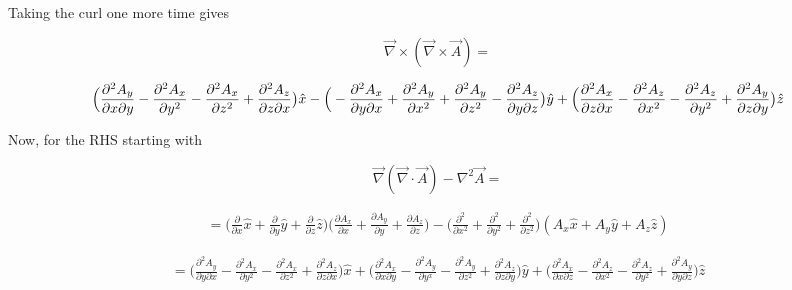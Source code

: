 \documentclass[11pt]{article}
\begin{document}
Taking the curl one more time gives

$$
\vec{\nabla} \times (\vec{\nabla} \times \vec{A}) = 
$$

$$
\Big(\frac{\partial^{2}A_{y}}{\partial x \partial y} - \frac{\partial^{2} A_{x}}{\partial y^{2}} - \frac{\partial^{2} A_{x}}{\partial z^{2}} + \frac{\partial^{2} A_{z}}{\partial z \partial x} \big) \hat{x} \\
- \Big(-\frac{\partial^{2}A_{x}}{\partial y \partial x} + \frac{\partial^{2} A_{y}}{\partial x^{2}} + \frac{\partial^{2} A_{y}}{\partial z^{2}} - \frac{\partial^{2} A_{z}}{\partial y \partial z} \big) \hat{y} \\
+ \Big(\frac{\partial^{2}A_{x}}{\partial z \partial x} - \frac{\partial^{2} A_{z}}{\partial x^{2}} - \frac{\partial^{2} A_{z}}{\partial y^{2}} + \frac{\partial^{2} A_{y}}{\partial z \partial y} \big) \hat{z}
$$

Now, for the RHS starting with 

$$
\vec{\nabla}(\vec{\nabla} \cdot \vec{A}) - \nabla^{2}\vec{A} =
$$

\begin{center}
\begin{eqnarray*}
 = \Big(\frac{\partial}{\partial x}\hat{x} + \frac{\partial}{\partial y}\hat{y} + \frac{\partial}{\partial z}\hat{z}\Big)\Big(\frac{\partial A_{x}}{\partial x} + \frac{\partial A_{y}}{\partial y} + \frac{\partial A_{z}}{\partial z} \Big) - \Big(\frac{\partial^{2}}{\partial x^{2}} +\frac{\partial^{2}}{\partial y^{2}} + \frac{\partial^{2}}{\partial z^{2}}\Big) (A_{x}\hat{x} + A_{y}\hat{y} + A_{z}\hat{z})
\end{eqnarray*}
\end{center}

\begin{center}
\begin{eqnarray*}
= \Big(\frac{\partial^{2}A_{y}}{\partial y \partial x} - \frac{\partial^{2} A_{x}}{\partial y^{2}} - \frac{\partial^{2} A_{x}}{\partial z^{2}} + \frac{\partial^{2} A_{z}}{\partial z \partial x} \big) \hat{x} 
+ \Big(\frac{\partial^{2}A_{x}}{\partial x \partial y} - \frac{\partial^{2} A_{y}}{\partial y^{x}} - \frac{\partial^{2} A_{y}}{\partial z^{2}} + \frac{\partial^{2} A_{z}}{\partial z \partial y} \big) \hat{y}
+ \Big(\frac{\partial^{2}A_{x}}{\partial x \partial z} - \frac{\partial^{2} A_{z}}{\partial x^{2}} - \frac{\partial^{2} A_{z}}{\partial y^{2}} + \frac{\partial^{2} A_{y}}{\partial y \partial z} \big) \hat{z}
\end{eqnarray*}
\end{center}
\end{document}
